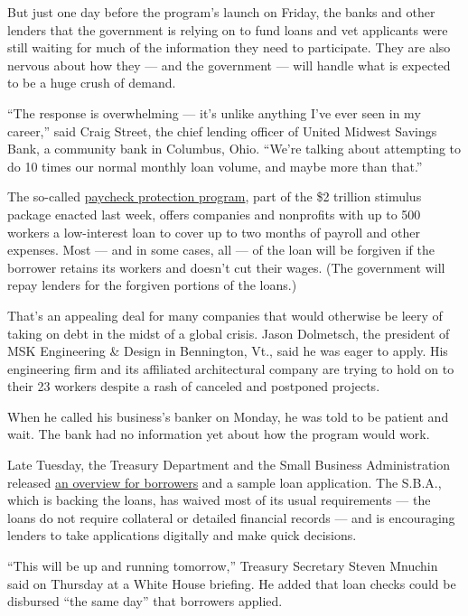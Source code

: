 But just one day before the program's launch on Friday, the banks and
other lenders that the government is relying on to fund loans and vet
applicants were still waiting for much of the information they need to
participate. They are also nervous about how they --- and the government
--- will handle what is expected to be a huge crush of demand.

``The response is overwhelming --- it's unlike anything I've ever seen
in my career,'' said Craig Street, the chief lending officer of United
Midwest Savings Bank, a community bank in Columbus, Ohio. ``We're
talking about attempting to do 10 times our normal monthly loan volume,
and maybe more than that.''

The so-called
\href{https://www.nytimes.com/2020/04/20/business/shake-shack-returning-loan-ppp-coronavirus.html}{paycheck
protection program}, part of the \$2 trillion stimulus package enacted
last week, offers companies and nonprofits with up to 500 workers a
low-interest loan to cover up to two months of payroll and other
expenses. Most --- and in some cases, all --- of the loan will be
forgiven if the borrower retains its workers and doesn't cut their
wages. (The government will repay lenders for the forgiven portions of
the loans.)

That's an appealing deal for many companies that would otherwise be
leery of taking on debt in the midst of a global crisis. Jason
Dolmetsch, the president of MSK Engineering \& Design in Bennington,
Vt., said he was eager to apply. His engineering firm and its affiliated
architectural company are trying to hold on to their 23 workers despite
a rash of canceled and postponed projects.

When he called his business's banker on Monday, he was told to be
patient and wait. The bank had no information yet about how the program
would work.

Late Tuesday, the Treasury Department and the Small Business
Administration released
\href{https://www.sba.gov/funding-programs/loans/paycheck-protection-program-ppp}{an
overview for borrowers} and a sample loan application. The S.B.A., which
is backing the loans, has waived most of its usual requirements --- the
loans do not require collateral or detailed financial records --- and is
encouraging lenders to take applications digitally and make quick
decisions.

``This will be up and running tomorrow,'' Treasury Secretary Steven
Mnuchin said on Thursday at a White House briefing. He added that loan
checks could be disbursed ``the same day'' that borrowers applied.

